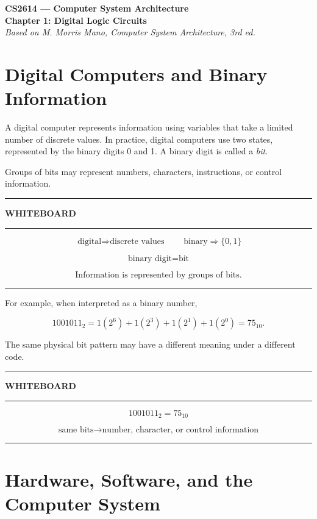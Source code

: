 \documentclass[11pt]{article}
\newenvironment{whiteboard}
{
    \par\medskip
    \hrule
    \vspace{0.35em}
    \noindent\textbf{\large WHITEBOARD}
    \par\vspace{0.3em}
    \hrule
    \vspace{0.65em}
}
{
    \vspace{0.45em}
    \hrule
    \par\medskip
}
\begin{document}
\begin{center}
    {\LARGE\textbf{CS2614 --- Computer System Architecture}}\\[0.45em]
    {\Large\textbf{Chapter 1: Digital Logic Circuits}}\\[0.45em]
    \textit{Based on M. Morris Mano,
    Computer System Architecture, 3rd ed.}
\end{center}

\section{Digital Computers and Binary Information}

A digital computer represents information using variables that take a limited
number of discrete values. In practice, digital computers use two states,
represented by the binary digits 0 and 1. A binary digit is called a
\emph{bit}.

Groups of bits may represent numbers, characters, instructions, or control
information.

\begin{whiteboard}

\[
\boxed{\text{digital}\Rightarrow\text{discrete values}}
\qquad
\boxed{\text{binary}\Rightarrow\{0,1\}}
\]

\[
\boxed{\text{binary digit}=\text{bit}}
\]

\[
\boxed{\text{Information is represented by groups of bits.}}
\]

\end{whiteboard}

For example, when interpreted as a binary number,

\[
1001011_2
=
1(2^6)+1(2^3)+1(2^1)+1(2^0)
=
75_{10}.
\]

The same physical bit pattern may have a different meaning under a different
code.

\begin{whiteboard}

\[
1001011_2=75_{10}
\]

\[
\boxed{
\text{same bits}
\rightarrow
\text{number, character, or control information}
}
\]

\end{whiteboard}

\section{Hardware, Software, and the Computer System}
\end{document}
